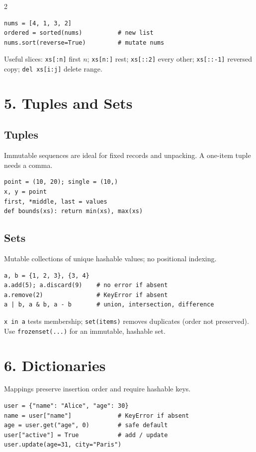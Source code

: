 \documentclass[10pt,a4paper]{article}
\newcommand{\py}[1]{\texttt{#1}}
\begin{document}
\begin{multicols}{2}
\begin{lstlisting}
nums = [4, 1, 3, 2]
ordered = sorted(nums)          # new list
nums.sort(reverse=True)         # mutate nums
\end{lstlisting}

Useful slices: \py{xs[:n]} first $n$; \py{xs[n:]} rest; \py{xs[::2]} every other; \py{xs[::-1]} reversed copy; \py{del xs[i:j]} delete range.

\section{5. Tuples and Sets}

\subsection{Tuples}
Immutable sequences are ideal for fixed records and unpacking. A one-item tuple needs a comma.

\begin{lstlisting}
point = (10, 20); single = (10,)
x, y = point
first, *middle, last = values
def bounds(xs): return min(xs), max(xs)
\end{lstlisting}

\subsection{Sets}
Mutable collections of unique hashable values; no positional indexing.

\begin{lstlisting}
a, b = {1, 2, 3}, {3, 4}
a.add(5); a.discard(9)    # no error if absent
a.remove(2)               # KeyError if absent
a | b, a & b, a - b       # union, intersection, difference
\end{lstlisting}

\py{x in a} tests membership; \py{set(items)} removes duplicates (order not preserved). Use \py{frozenset(...)} for an immutable, hashable set.

\section{6. Dictionaries}

Mappings preserve insertion order and require hashable keys.

\begin{lstlisting}
user = {"name": "Alice", "age": 30}
name = user["name"]             # KeyError if absent
age = user.get("age", 0)        # safe default
user["active"] = True           # add / update
user.update(age=31, city="Paris")
\end{lstlisting}


\end{multicols}
\end{document}
